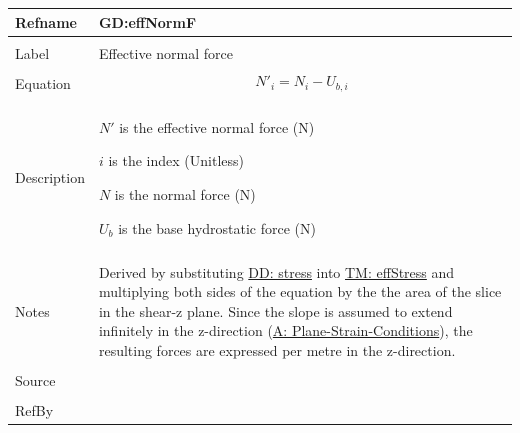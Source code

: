 \documentclass[12pt]{article}
\begin{document}
\noindent \begin{minipage}{\textwidth}
\begin{tabular}{p{} p{}}
\toprule \textbf{Refname} & \textbf{GD:effNormF}
\label{GD:effNormF}
\\ \midrule \\
Label & Effective normal force
        \\ \midrule \\
        Equation & \begin{displaymath}
                   {N'}_{i}=N_{i}-{U_{b,i}}
                   \end{displaymath}
                   \\ \midrule \\
                   Description & \begin{symbDescription}
                                 \item{$N'$ is the effective normal force (N)}
                                 \item{$i$ is the index (Unitless)}
                                 \item{$N$ is the normal force (N)}
                                 \item{${U_{b}}$ is the base hydrostatic force (N)}
                                 \end{symbDescription}
                                 \\ \midrule \\
                                 Notes & Derived by substituting \hyperref[DD:stress]{DD: stress} into \hyperref[TM:effStress]{TM: effStress} and multiplying both sides of the equation by the the area of the slice in the shear-z plane. Since the slope is assumed to extend infinitely in the z-direction (\hyperref[A:Plane-Strain-Conditions]{A: Plane-Strain-Conditions}), the resulting forces are expressed per metre in the z-direction.
                                         \\ \midrule \\
                                         Source & \cite{chen2005}
                                                  \\ \midrule \\
                                                  RefBy & 
\\ \bottomrule \end{tabular}
\end{minipage}
\par~
\end{document}

